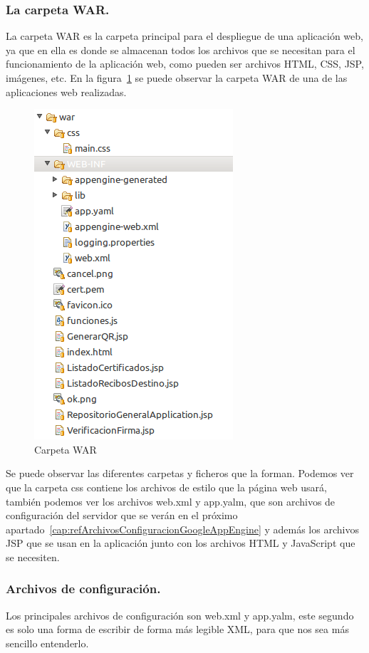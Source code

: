 \begin{itemize}
\subsubsection{La carpeta WAR.}

La carpeta WAR es la carpeta principal para el despliegue de una aplicación web, ya que en ella es donde se almacenan todos los archivos que se necesitan para el funcionamiento de la aplicación web, como pueden ser archivos HTML, CSS, JSP, imágenes, etc. En la figura~\ref{fig:carpetawar} se puede observar la carpeta WAR de una de las aplicaciones web realizadas.

\begin{figure}
  \centering
    \includegraphics{./GoogleAppEngine/imagenes/carpetawar.png}
  \caption{Carpeta WAR}
  \label{fig:carpetawar}
\end{figure}

Se puede observar las diferentes carpetas y ficheros que la forman. Podemos ver que la carpeta css contiene los archivos de estilo que la página web usará, también podemos ver los archivos web.xml y app.yalm, que son archivos de configuración del servidor que se verán en el próximo apartado~\ref{cap:refArchivosConfiguracionGoogleAppEngine} y además los archivos JSP que se usan en la aplicación junto con los archivos HTML y JavaScript que se necesiten.

\subsubsection{Archivos de configuración.\label{cap:refArchivosConfiguracionGoogleAppEngine}}
Los principales archivos de configuración son web.xml y app.yalm, este segundo es solo una forma de escribir de forma más legible XML, para que nos sea más sencillo entenderlo.


\end{itemize}
